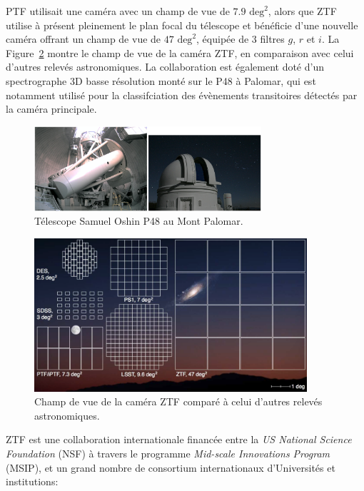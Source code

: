 \documentclass[../main/main.tex]{subfiles}
\begin{document}
PTF utilisait une caméra avec un champ de vue de $7.9 \text{ deg}^{2}$,
alors que ZTF utilise à présent pleinement le plan focal du télescope et
bénéficie d'une nouvelle caméra offrant un champ de vue de $47
\text{ deg}^{2}$, équipée de 3 filtres $g$, $r$ et $i$. La
Figure~\ref{fig:ztfcamerafov} montre le champ de vue de la caméra ZTF,
en comparaison avec celui d'autres relevés astronomiques. La collaboration est également doté d'un spectrographe
3D basse résolution \citep[$R\approx100$;][]{SEDM18} monté sur le P48 à
Palomar, qui est notamment
utilisé pour la classifciation des évènements transitoires détectés par la caméra principale.

\begin{figure}[h]
  \centering
  \includegraphics[width=0.75\textwidth]{../figures/02_ztf/p48.png}
  \caption{Télescope Samuel Oshin P48 au Mont Palomar.}
  \label{fig:p48}
\end{figure}


\begin{figure}[h]
\centering
\includegraphics[width=0.9\textwidth]{../figures/02_ztf/ztfcamerafov.png}
\caption{Champ de vue de la caméra ZTF comparé à celui d'autres relevés astronomiques.}
\label{fig:ztfcamerafov}
\end{figure}

ZTF est une collaboration internationale financée entre
la \textit{US National Science Foundation} (NSF) à travers le programme \textit{Mid-scale
Innovations Program} (MSIP), et un grand nombre de consortium
internationaux d'Universités et institutions:
\end{document}
